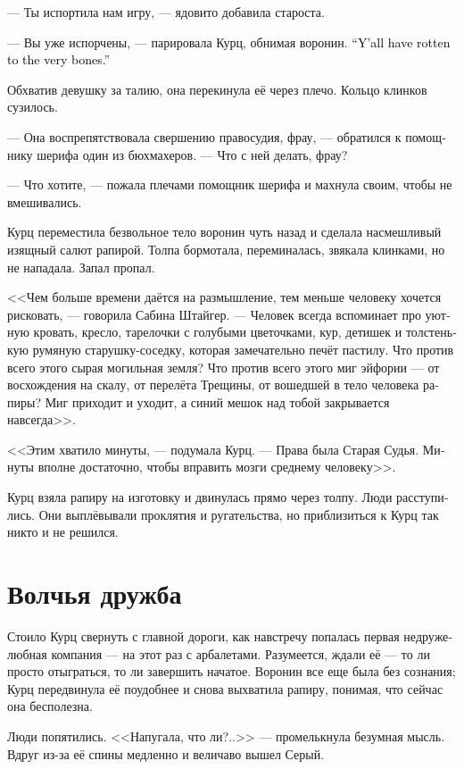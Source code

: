 \documentclass[a4paper,12pt,fleqn]{book}\usepackage{cooltooltips}\usepackage{polyglossia}\setdefaultlanguage[babelshorthands=true]{russian}\setotherlanguage{english}\defaultfontfeatures{Ligatures=TeX,Mapping=tex-text} \usepackage{xcolor}\definecolor{lightgray}{HTML}{bbbbbb}\color{lightgray}\newcommand{\ml}[3]{\textenglish{\textcolor{black}{#3}}}
\begin{document}
--- Ты испортила нам игру, --- ядовито добавила староста.

--- Вы уже испорчены, --- парировала Курц, обнимая воронин.
\ml{$0$}
{--- Вы все прогнили до костей.}
{``Y'all have rotten to the very bones.''}

Обхватив девушку за талию, она перекинула её через плечо.
Кольцо клинков сузилось.

--- Она воспрепятствовала свершению правосудия, фрау, --- обратился к помощнику шерифа один из бюхмахеров.
--- Что с ней делать, фрау?

--- Что хотите, --- пожала плечами помощник шерифа и махнула своим, чтобы не вмешивались.

Курц переместила безвольное тело воронин чуть назад и сделала насмешливый изящный салют рапирой.
Толпа бормотала, переминалась, звякала клинками, но не нападала.
Запал пропал.

<<Чем больше времени даётся на размышление, тем меньше человеку хочется рисковать, --- говорила Сабина Штайгер.
--- Человек всегда вспоминает про уютную кровать, кресло, тарелочки с голубыми цветочками, кур, детишек и толстенькую румяную старушку-соседку, которая замечательно печёт пастилу.
Что против всего этого сырая могильная земля?
Что против всего этого миг эйфории --- от восхождения на скалу, от перелёта Трещины, от вошедшей в тело человека рапиры?
Миг приходит и уходит, а синий мешок над тобой закрывается навсегда>>.

<<Этим хватило минуты, --- подумала Курц.
--- Права была Старая Судья.
Минуты вполне достаточно, чтобы вправить мозги среднему человеку>>.

Курц взяла рапиру на изготовку и двинулась прямо через толпу.
Люди расступились.
Они выплёвывали проклятия и ругательства, но приблизиться к Курц так никто и не решился.

\section{Волчья дружба}

Стоило Курц свернуть с главной дороги, как навстречу попалась первая недружелюбная компания --- на этот раз с арбалетами.
Разумеется, ждали её --- то ли просто отыграться, то ли завершить начатое.
Воронин все еще была без сознания;
Курц передвинула её поудобнее и снова выхватила рапиру, понимая, что сейчас она бесполезна.

Люди попятились.
<<Напугала, что ли?..>> --- промелькнула безумная мысль.
Вдруг из-за её спины медленно и величаво вышел Серый.
\end{document}
